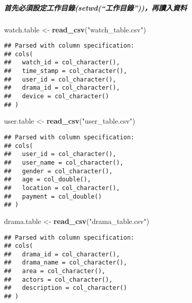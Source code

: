 \documentclass[]{article}
\newenvironment{Shaded}{\begin{snugshade}}{\end{snugshade}}
\newcommand{\KeywordTok}[1]{\textcolor[rgb]{0.13,0.29,0.53}{\textbf{#1}}}
\newcommand{\NormalTok}[1]{#1}
\newcommand{\StringTok}[1]{\textcolor[rgb]{0.31,0.60,0.02}{#1}}
\let\oldsubparagraph\subparagraph
\renewcommand{\subparagraph}[1]{\oldsubparagraph{#1}\mbox{}}
\begin{document}
\hypertarget{ux9996ux5148ux5fc5ux9808ux8a2dux5b9aux5de5ux4f5cux76eeux9304setwdux5de5ux4f5cux76eeux9304ux518dux8b80ux5165ux8cc7ux6599}{%
\subparagraph{首先必須設定工作目錄(setwd(``工作目錄''))，再讀入資料}\label{ux9996ux5148ux5fc5ux9808ux8a2dux5b9aux5de5ux4f5cux76eeux9304setwdux5de5ux4f5cux76eeux9304ux518dux8b80ux5165ux8cc7ux6599}}

\begin{Shaded}
\begin{Highlighting}[]
\NormalTok{watch.table <-}\StringTok{ }\KeywordTok{read_csv}\NormalTok{(}\StringTok{"watch_table.csv"}\NormalTok{)}
\end{Highlighting}
\end{Shaded}

\begin{verbatim}
## Parsed with column specification:
## cols(
##   watch_id = col_character(),
##   time_stamp = col_character(),
##   user_id = col_character(),
##   drama_id = col_character(),
##   device = col_character()
## )
\end{verbatim}

\begin{Shaded}
\begin{Highlighting}[]
\NormalTok{user.table <-}\StringTok{ }\KeywordTok{read_csv}\NormalTok{(}\StringTok{"user_table.csv"}\NormalTok{)}
\end{Highlighting}
\end{Shaded}

\begin{verbatim}
## Parsed with column specification:
## cols(
##   user_id = col_character(),
##   user_name = col_character(),
##   gender = col_character(),
##   age = col_double(),
##   location = col_character(),
##   payment = col_double()
## )
\end{verbatim}

\begin{Shaded}
\begin{Highlighting}[]
\NormalTok{drama.table <-}\StringTok{ }\KeywordTok{read_csv}\NormalTok{(}\StringTok{"drama_table.csv"}\NormalTok{)}
\end{Highlighting}
\end{Shaded}

\begin{verbatim}
## Parsed with column specification:
## cols(
##   drama_id = col_character(),
##   drama_name = col_character(),
##   area = col_character(),
##   actors = col_character(),
##   description = col_character()
## )
\end{verbatim}
\end{document}
